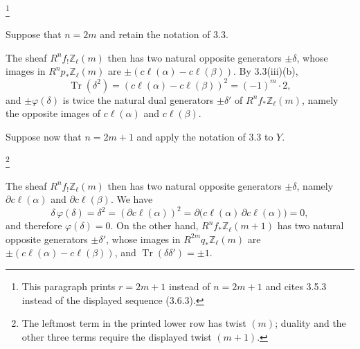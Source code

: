 \footnote{This paragraph prints $r=2m+1$ instead of $n=2m+1$ and cites
3.5.3 instead of the displayed sequence (3.6.3).}

Suppose that $n=2m$ and retain the notation of 3.3.


\begin{center}
\end{center}

The sheaf $R^nf_!\mathbb Z_\ell(m)$ then has two natural opposite
generators $\pm\delta$, whose images in
$R^np_*\mathbb Z_\ell(m)$ are
$\pm(c\ell(\alpha)-c\ell(\beta))$.  By 3.3(iii)(b),
\begin{equation*}
\operatorname{Tr}(\delta^2)
=(c\ell(\alpha)-c\ell(\beta))^2=(-1)^m\cdot2,
\end{equation*}
and $\pm\varphi(\delta)$ is twice the natural dual generators
$\pm\delta'$ of $R^nf_*\mathbb Z_\ell(m)$, namely the opposite images
of $c\ell(\alpha)$ and $c\ell(\beta)$.

Suppose now that $n=2m+1$ and apply the notation of 3.3 to $Y$.

\begin{center}
\end{center}

\footnote{The leftmost term in the printed lower row has twist $(m)$;
duality and the other three terms require the displayed twist $(m+1)$.}

The sheaf $R^nf_!\mathbb Z_\ell(m)$ then has two natural opposite
generators $\pm\delta$, namely
$\partial c\ell(\alpha)$ and $\partial c\ell(\beta)$.  We have
\begin{equation*}
\delta\,\varphi(\delta)=\delta^2
=(\partial c\ell(\alpha))^2
=\partial\bigl(c\ell(\alpha)\,\partial c\ell(\alpha)\bigr)=0,
\end{equation*}
and therefore $\varphi(\delta)=0$.  On the other hand,
$R^nf_*\mathbb Z_\ell(m+1)$ has two natural opposite generators
$\pm\delta'$, whose images in $R^{2m}q_*\mathbb Z_\ell(m)$ are
$\pm(c\ell(\alpha)-c\ell(\beta))$, and
$\operatorname{Tr}(\delta\delta')=\pm1$.

